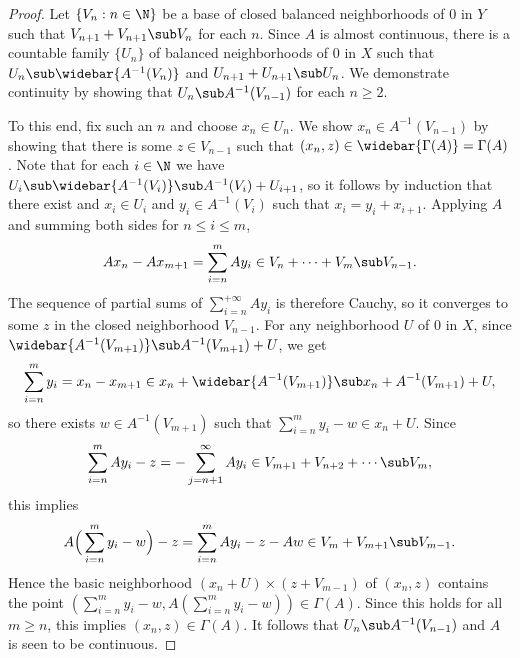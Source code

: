 \begin{proof}
Let $\{V_n:n\in\N\}$ be a base of closed balanced neighborhoods of $0$ in $Y$ such that $V_{n+1}+V_{n+1}\sub V_n$ for each $n$. Since $A$ is almost continuous, there is a countable family $\{U_n\}$ of balanced neighborhoods of $0$ in $X$ such that $U_n\sub\widebar{A^{-1}(V_n)}$ and $U_{n+1}+U_{n+1}\sub U_n$. We demonstrate continuity by showing that $U_n\sub A^{-1}(V_{n-1})$ for each $n\geq 2$.\par
To this end, fix such an $n$ and choose $x_n\in U_n$. We show $x_n\in A^{-1}(V_{n-1})$ by showing that there is some $z\in V_{n-1}$ such that $(x_n,z)\in\widebar{\Gamma(A)}=\Gamma(A)$. Note that for each $i\in\N$ we have $U_i\sub\widebar{A^{-1}(V_i)}\sub A^{-1}(V_i)+U_{i+1}$, so it follows by induction that there exist and $x_i\in U_i$ and $y_i\in A^{-1}(V_i)$ such that $x_i=y_i+x_{i+1}$. Applying $A$ and summing both sides for $n\leq i\leq m$,
\[Ax_n-Ax_{m+1}=\sum_{i=n}^{m}Ay_i\in V_n+\cdots+V_m\sub V_{n-1}.\]
The sequence of partial sums of $\sum_{i=n}^{+\infty}Ay_i$ is therefore Cauchy, so it converges to some $z$ in the closed neighborhood $V_{n-1}$. For any neighborhood $U$ of $0$ in $X$, since $\widebar{A^{-1}(V_{m+1})}\sub A^{-1}(V_{m+1})+U$, we get
\[\sum_{i=n}^{m}y_i=x_n-x_{m+1}\in x_n+\widebar{A^{-1}(V_{m+1})}\sub x_n+A^{-1}(V_{m+1})+U,\]
so there exists $w\in A^{-1}(V_{m+1})$ such that $\sum_{i=n}^{m}y_i-w\in x_n+U$. Since
\[\sum_{i=n}^{m}Ay_i-z=-\sum_{j=n+1}^{\infty}Ay_i\in V_{m+1}+V_{n+2}+\cdots\sub V_m,\]
this implies
\[A\Big(\sum_{i=n}^{m}y_i-w\Big)-z=\sum_{i=n}^{m}Ay_i-z-Aw\in V_m+V_{m+1}\sub V_{m-1}.\]
Hence the basic neighborhood $(x_n+U)\times(z+V_{m-1})$ of $(x_n,z)$ contains the point $(\sum_{i=n}^{m}y_i-w,A(\sum_{i=n}^{m}y_i-w))\in\Gamma(A)$. Since this holds for all $m\geq n$, this implies $(x_n,z)\in\Gamma(A)$. It follows that $U_n\sub A^{-1}(V_{n-1})$ and $A$ is seen to be continuous.
\end{proof}
